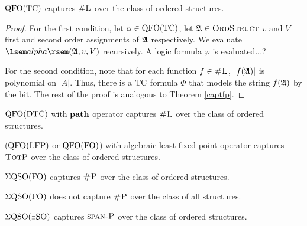 \begin{theorem}
	${\rm QFO}({\rm TC})$ captures $\text{\sc \#L}$ over the class of ordered structures.
\end{theorem}
\begin{proof}
	For the first condition, let $\alpha\in{\rm QFO}({\rm TC})$, let $\mathfrak{A}\in\text{\sc OrdStruct}$ $v$ and $V$ first and second order assignments of $\mathfrak{A}$ respectively. We evaluate $\sem{alpha}(\A,v,V)$ recursively. A logic formula $\varphi$ is evaluated...?
	
	For the second condition, note that for each function $f\in \text{\sc \#L}$, $\vert f(\mathfrak{A}) \vert$ is polynomial on $\vert A \vert$. Thus, there is a ${\rm TC}$ formula $\Phi$ that models the string $f(\mathfrak{A})$ by the bit. The rest of the proof is analogous to Theorem \ref{captfp}.
\end{proof}

\begin{theorem}
	${\rm QFO}({\rm DTC})$ with ${\bf path}$ operator captures $\text{\sc \#L}$ over the class of ordered structures.
\end{theorem}

\begin{theorem}
	(${\rm QFO}({\rm LFP})$ or ${\rm QFO}({\rm FO})$) with algebraic least fixed point operator captures $\text{\sc TotP}$ over the class of ordered structures.
\end{theorem}
	

\begin{theorem}
$\Sigma{\rm QSO}({\rm FO})$ captures $\text{\sc \#P}$ over the class of ordered structures.
\end{theorem}

\begin{proposition}
$\Sigma{\rm QSO}({\rm FO})$ does not capture $\text{\sc \#P}$ over the class of all structures.
\end{proposition}



\begin{theorem}
$\Sigma{\rm QSO}(\exists{\rm SO})$ captures $\text{\sc span-P}$ over the class of ordered structures.
\end{theorem}
